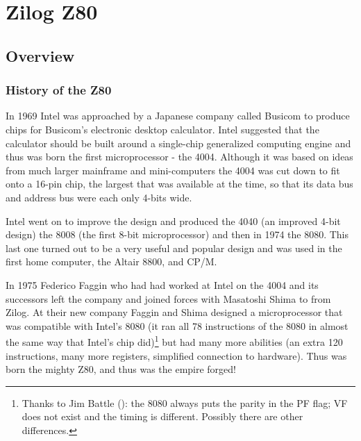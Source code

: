 \documentclass[12pt,twoside,openright,a4paper]{book}
\begin{document}
\pagebreak
\IntentionallyEmpty
\pagebreak


\chapter{Zilog Z80}


\minitoc

\pagebreak
\section{Overview}
\subsection{History of the Z80}

In 1969 Intel was approached by a Japanese company called Busicom to produce  chips for Busicom's electronic desktop calculator. Intel suggested that the calculator should be built around a single-chip generalized computing engine and thus was born the first microprocessor - the 4004. Although it was based on ideas from much larger mainframe and mini-computers the 4004 was cut down to fit onto a 16-pin chip, the largest that was available at the time, so that its data bus and address bus were each only 4-bits wide. 

Intel went on to improve the design and produced the 4040 (an improved 4-bit design) the 8008 (the first 8-bit microprocessor) and then in 1974 the 8080. This last one turned out to be a very useful and popular design and was used in the first home computer, the Altair 8800, and CP/M. 

In 1975 Federico Faggin who had had worked at Intel on the 4004 and its successors left the company and joined forces with Masatoshi Shima to from Zilog. At their new company Faggin and Shima designed a microprocessor that was compatible with Intel's 8080 (it ran all 78 instructions of the 8080 in almost the same way that Intel's chip did)\footnote{Thanks to Jim Battle (): the 8080 always puts the parity in the PF flag; VF does not exist and the timing is different. Possibly there are other differences.} but had many more abilities (an extra 120 instructions, many more registers, simplified connection to hardware). Thus was born the mighty Z80, and thus was the empire forged!
\end{document}
